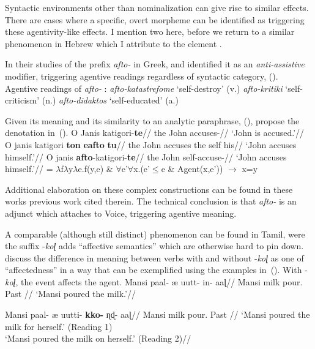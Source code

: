 Syntactic environments other than nominalization can give rise to similar effects. There are cases where a specific, overt morpheme can be identified as triggering these agentivity-like effects. I mention two here, before we return to a similar phenomenon in Hebrew which I attribute to the element {\va}.

In their studies of the prefix \emph{afto-} in Greek, \cite{alexiadouafto} and \cite{spathasetal15} identified it as an \emph{anti-assistive} modifier, triggering agentive readings regardless of syntactic category, (\nextx).
\pex Agentive readings of \emph{afto-} \citep[61]{alexiadouafto}:
	\a \emph{afto-katastrefome} `self-destroy' (v.)
	\a \emph{afto-kritiki} `self-criticism' (n.)
	\a \emph{afto-didaktos} `self-educated' (a.)
\xe

Given its meaning and its similarity to an analytic paraphrase, (\nextx), \cite{spathasetal15} propose the denotation in~(\anextx).
\pex \citep[63--64]{alexiadouafto}
	\a \begingl
		\gla O Janis katigori-\textbf{te}//
		\glb the John accuses-//
		\glft `John is accused.'//
	\endgl
	\a \begingl
		\gla O janis katigori \textbf{ton} \textbf{eafto} \textbf{tu}//
		\glb the John accuses the self his//
		\glft `John accuses himself.'//
	\endgl
	\a \begingl
		\gla O janis \textbf{afto}-katigori-\textbf{te}//
		\glb the John self-accuse-//
		\glft `John accuses himself.'//
	\endgl
\xe
\ex {} = $\lambda$f$\lambda$y$\lambda$e.f(y,e) \& $\forall$e'$\forall$x.(e'$\le$e \& Agent(x,e')) $\rightarrow$ x=y \hfill \citep[1335]{spathasetal15}
\xe

Additional elaboration on these complex constructions can be found in these works previous work cited therein. The technical conclusion is that \emph{afto-} is an adjunct which attaches to Voice, triggering agentive meaning.

A comparable (although still distinct) phenomenon can be found in Tamil, were the suffix -\emph{koɭ} adds ``affective semantics'' which are otherwise hard to pin down. \cite{sundaresanmcfadden17} discuss the difference in meaning between verbs with and without -\emph{koɭ} as one of ``affectedness'' in a way that can be exemplified using the examples in~(\nextx). With -\emph{koɭ}, the event affects the agent.
\pex
	\a \begingl
	\gla Mansi paal- æ uutt- in- aaɭ//
	\glb Mansi milk  pour. Past //
	\glft `Mansi poured the milk.'//
	\endgl

	\a 	\begingl
	\gla Mansi paal- æ uutti- \textbf{kko-} ɳɖ- aaɭ//
	\glb Mansi milk  pour.  Past //
	\glft `Mansi poured the milk for herself.' (Reading 1)\\
		`Mansi poured the milk on herself.' (Reading 2)//
	\endgl
\xe

